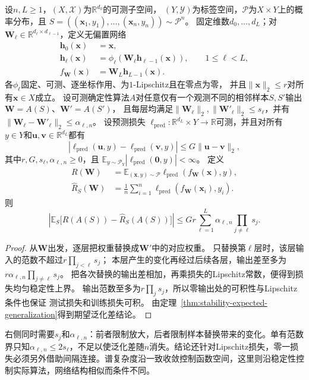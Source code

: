\begin{theorem}[分层参数稳定性与期望泛化差]
\label{thm:layerwise-parameter-stability}
设$n,L\geq1$，$(X,\mathcal X)$为$\mathbb R^{d_0}$的可测子空间，
$(Y,\mathcal Y)$为标签空间，$\mathcal P$为$X\times Y$上的概率分布，且
$S=((\bm x_1,y_1),\ldots,(\bm x_n,y_n))\sim\mathcal P^n$。
固定维数$d_0,\ldots,d_L$；对
$\bm W_\ell\in\mathbb R^{d_\ell\times d_{\ell-1}}$，定义无偏置网络
\[
\begin{aligned}
 \bm h_0(\bm x)&=\bm x,\\
 \bm h_\ell(\bm x)
 &=\phi_\ell(\bm W_\ell\bm h_{\ell-1}(\bm x)),
 \qquad 1\leq\ell<L,\\
 f_{\bm W}(\bm x)&=\bm W_L\bm h_{L-1}(\bm x).
\end{aligned}
\]
各$\phi_\ell$固定、可测、逐坐标作用、为$1$-Lipschitz且在零点为零，
并且$\|\bm x\|_2\leq r$对所有$\bm x\in X$成立。
设可测确定性算法$A$对任意仅有一个观测不同的相邻样本$S,S'$输出
$\bm W=A(S)$、$\bm W'=A(S')$，
且每层均满足$\|\bm W_\ell\|_2,\|\bm W'_\ell\|_2\leq s_\ell$，并有
$\|\bm W_\ell-\bm W'_\ell\|_2\leq\alpha_{\ell,n}$。
设预测损失
$\ell_{\mathrm{pred}}:\mathbb R^{d_L}\times Y\to\mathbb R$可测，并且对所有
$y\in Y$和$\bm u,\bm v\in\mathbb R^{d_L}$都有
\[
 |\ell_{\mathrm{pred}}(\bm u,y)-\ell_{\mathrm{pred}}(\bm v,y)|
 \leq G\|\bm u-\bm v\|_2,
\]
其中$r,G,s_\ell,\alpha_{\ell,n}\geq0$，且
$\mathbb E_{y\sim\mathcal P_Y}|\ell_{\mathrm{pred}}(\bm 0,y)|<\infty$。
定义
\[
\begin{aligned}
 R(\bm W)
 &=\mathbb E_{(\bm x,y)\sim\mathcal P}
   \ell_{\mathrm{pred}}(f_{\bm W}(\bm x),y),\\
 \hat R_S(\bm W)
 &=\frac1n\sum_{i=1}^n
   \ell_{\mathrm{pred}}(f_{\bm W}(\bm x_i),y_i).
\end{aligned}
\]
则
\[
 \left|\mathbb E_S\bigl[R(A(S))-\hat R_S(A(S))\bigr]\right|
 \leq Gr\sum_{\ell=1}^L\alpha_{\ell,n}\prod_{j\ne\ell}s_j.
\]
\end{theorem}
\begin{proof}
从$\bm W$出发，逐层把权重替换成$\bm W'$中的对应权重。
只替换第$\ell$层时，该层输入的范数不超过$r\prod_{j<\ell}s_j$；
本层产生的变化再经过后续各层，输出差至多为
$r\alpha_{\ell,n}\prod_{j\ne\ell}s_j$。
把各次替换的输出差相加，再乘损失的Lipschitz常数，便得到损失均匀稳定性上界。
输出范数至多为$r\prod_j s_j$，所以零输出处的可积性与Lipschitz条件也保证
测试损失和训练损失可积。
由定理~\ref{thm:stability-expected-generalization}得到期望泛化差结论。
\end{proof}

右侧同时需要$s_j$和$\alpha_{\ell,n}$：前者限制放大，后者限制样本替换带来的变化。单有范数界只知$\alpha_{\ell,n}\leq2s_\ell$，不足以使泛化差随$n$消失。结论还针对Lipschitz损失，零一损失必须另外借助间隔连接。谱复杂度沿一致收敛控制函数空间，这里则沿稳定性控制实际算法，网络结构相似而条件不同。

